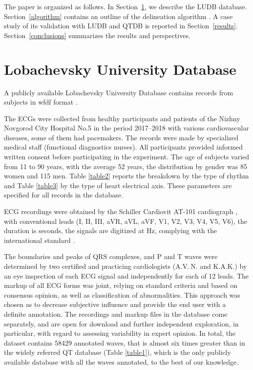 \documentclass[submitted]{ieeeaccess}
\newcommand{\NewCorrection}[1]{{#1}}
\begin{document}
The paper is organized as follows.
In Section~\ref{database}, we describe the LUDB database.
Section~\ref{algorithm} contains an outline of the delineation algorithm \cite{Kalyakulina2018}. A case study of its validation with LUDB and QTDB is reported in Section~\ref{results}.
Section~\ref{conclusions} summarizes the results and perspectives.


\section{Lobachevsky University Database}\label{database}

A publicly available Lobachevsky University Database \cite{Our_PhysioNet} contains  records from  subjects in wfdf format \cite{PhysioNet}. 

The ECGs were collected from healthy participants and patients of the Nizhny Novgorod City Hospital No.5 in the period 2017--2018 with various cardiovascular diseases, some of them had pacemakers. The records were made by specialized medical staff (functional diagnostics nurses).
All participants provided informed written consent before participating in the experiment. The age of subjects varied from 11 to 90 years, with the average 52 years, the distribution by gender was 85 women and 115 men. Table \ref{table2} reports the breakdown by the type of rhythm and Table \ref{table3} by the type of heart electrical axis. These parameters are specified for all records in the database.

ECG recordings were obtained by the Schiller Cardiovit AT-101 cardiograph \cite{schiller}, with conventional  leads (I, II, III, aVR, aVL, aVF, V1, V2, V3, V4, V5, V6), the duration is  seconds, the signals are digitized at  Hz, complying with the international \NewCorrection{standard} \cite{IEC}. 

The boundaries and peaks of QRS \NewCorrection{complexes}, and P and T waves were determined by two certified and practicing cardiologists (A.V.\,N. and K.A.K.) by an eye inspection of each ECG signal and independently for each of 12 leads. 
The markup of all ECG forms was joint, relying on standard criteria \cite{book} and based on consensus opinion, as well as classification of abnormalities. This approach was chosen as to decrease subjective influence and provide the end user with a definite annotation. The recordings and markup files in the database come separately, and are open for download and further independent exploration, in particular, with regard to assessing variability in expert opinion. In total, the dataset contains 58429 annotated waves, that is almost six times greater than in the widely referred QT database (Table \ref{table1}), which is the only publicly available database with all the waves annotated, to the best of our knowledge.
\end{document}
